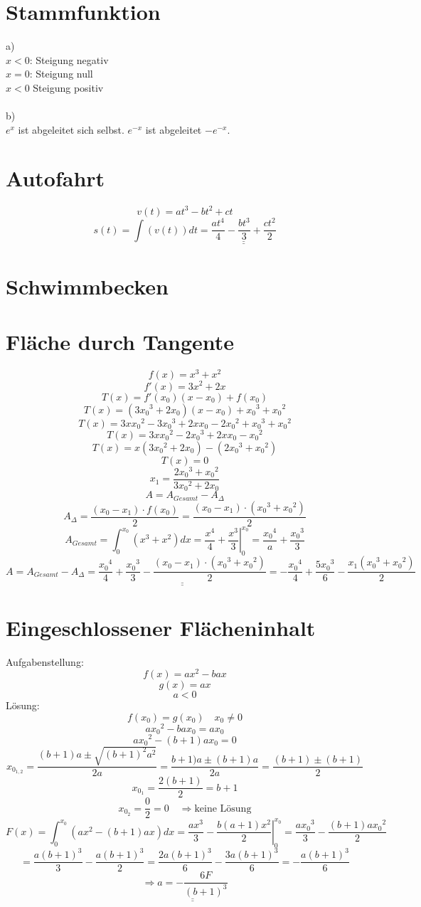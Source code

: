 \section{Stammfunktion}
a)\\
$x<0$: Steigung negativ\\
$x=0$: Steigung null\\
$x<0$ Steigung positiv\\\\
b)\\
$e^x$ ist abgeleitet sich selbst. $e^{-x}$ ist abgeleitet $-e^{-x}$. 

\section{Autofahrt}
\[ v(t) = a t^3 - b t^2 + c t \]
\[ s(t) = \int (v(t)) dt = \underline{\underline{\frac{a t^4}{4} - \frac{b t^3}{3} + \frac{c t^2}{2}}} \]

\section{Schwimmbecken}

\section{Fläche durch Tangente}
\[ f(x) = x^3 + x^2 \]
\[ f'(x) = 3 x^2 + 2 x \]
\[ T(x) = f'(x_0)(x - x_0) + f(x_0) \]
\[ T(x) = (3 {x_0}^3 + 2 x_0)(x-x_0) + {x_0}^3 + {x_0}^2 \]
\[ T(x) = 3 x {x_0}^2 - 3 {x_0}^3 + 2 x x_0 - 2 {x_0}^2 + {x_0}^3 + {x_0}^2 \]
\[ T(x) = 3 x {x_0}^2 - 2 {x_0}^3 + 2 x x_0 - {x_0}^2 \]
\[ T(x) = x(3 {x_0}^2 + 2 x_0) - (2 {x_0}^3 + {x_0}^2) \]
\[ T(x) = 0 \]
\[ x_1 = \frac{2 {x_0}^3 + {x_0}^2}{3 {x_0}^2 + 2 x_0} \]
\[ A = A_{Gesamt} - A_\Delta \]
\[ A_\Delta = \frac{(x_0 - x_1) \cdot f(x_0)}{2} = \frac{(x_0 - x_1) \cdot ({x_0}^3 + {x_0}^2)}{2} \]
\[ A_{Gesamt} = \int_0^{x_0} (x^3 + x^2) dx = \left.\frac{x^4}{4} + \frac{x^3}{3} \right|_{0}^{x_0} = \frac{{x_0}^4}{a} + \frac{{x_0}^3}{3} \]
\[ A = A_{Gesamt} - A_\Delta = \underline{\underline{\frac{{x_0}^4}{4} + \frac{{x_0}^3}{3} - \frac{(x_0 - x_1) \cdot ({x_0}^3 + {x_0}^2)}{2}}} = -\frac{{x_0}^4}{4} + \frac{5 {x_0}^3}{6} - \frac{x_1 ({x_0}^3 + {x_0}^2)}{2} \]

\section{Eingeschlossener Flächeninhalt}
Aufgabenstellung: 
\[ f(x) = ax^2 - bax \]
\[ g(x) = ax \]
\[ a < 0 \]
Lösung: 
\[ f(x_0) = g(x_0) \quad x_0 \neq 0 \]
\[ a{x_0}^2 - bax_0 = ax_0 \]
\[ a{x_0}^2 - (b+1)ax_0 = 0 \]
\[ x_{0_{1,2}} = \frac{(b+1)a \pm \sqrt{(b+1)^2a^2}}{2a} = \frac{b+1)a \pm (b+1)a}{2a} = \frac{(b+1) \pm (b+1)}{2} \]
\[ x_{0_1} = \frac{2(b+1)}{2} = b+1 \]
\[ x_{0_2} = \frac{0}{2} = 0 \quad \Rightarrow \text{keine Lösung} \]
\[ F(x) = \int_0^{x_0} (ax^2 - (b+1)ax) dx = \left.\frac{ax^3}{3} - \frac{b(a+1)x^2}{2}\right|_0^{x_0} = \frac{a{x_0}^3}{3} - \frac{(b+1)a{x_0}^2}{2} \]
\[ = \frac{a{(b+1)}^3}{3} - \frac{a{(b+1)}^3}{2} = \frac{2a(b+1)^3}{6} - \frac{3a(b+1)^3}{6} = -\frac{a(b+1)^3}{6} \]
\[ \Rightarrow \underline{\underline{a = -\frac{6F}{(b+1)^3}}} \]

